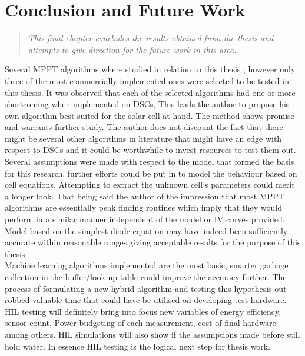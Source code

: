 \chapter{Conclusion and Future Work}
\begin{quote} 
\it This final chapter concludes the results obtained from the thesis and attempts to give direction for the future work in this area.
\end{quote}

Several \ac{MPPT} algorithms where studied in relation to this thesis , however only three of the most commercially implemented ones were selected to be tested in this thesis. It was observed that each of the selected algorithms had one or more shortcoming when implemented on \ac{DSCs}, This leads the author to propose his own algorithm best suited for the solar cell at hand. The method shows promise and warrants further study. The author does not discount the fact that there might be several other algorithms in literature that might have an edge with respect to \ac{DSCs} and it could be worthwhile to invest resources to test them out.\\

Several assumptions were made with respect to the model that formed the basis for this research, further efforts could be put in to model the behaviour based on cell equations. Attempting to extract the unknown cell's parameters could merit a longer look. That being said the author of the impression that most \ac{MPPT} algorithms are essentially peak finding routines which imply that they would perform in a similar manner independent of the model or IV curves provided. Model based on the simplest diode equation may have indeed been sufficiently accurate within reasonable ranges,giving acceptable results for the purpose of this thesis.\\

Machine learning algorithms implemented are the most basic, smarter garbage collection in the buffer/look up table could improve the accuracy further. The process of formulating a new hybrid algorithm and testing this hypothesis out robbed valuable time that could have be utilised on developing test hardware. \ac{HIL} testing will definitely bring into focus new variables of energy efficiency, sensor count, Power budgeting of each measurement, cost of final hardware among others. \ac{HIL} simulations will also show if the assumptions made before still hold water. In essence \ac{HIL} testing is the logical next step for thesis work.\\

